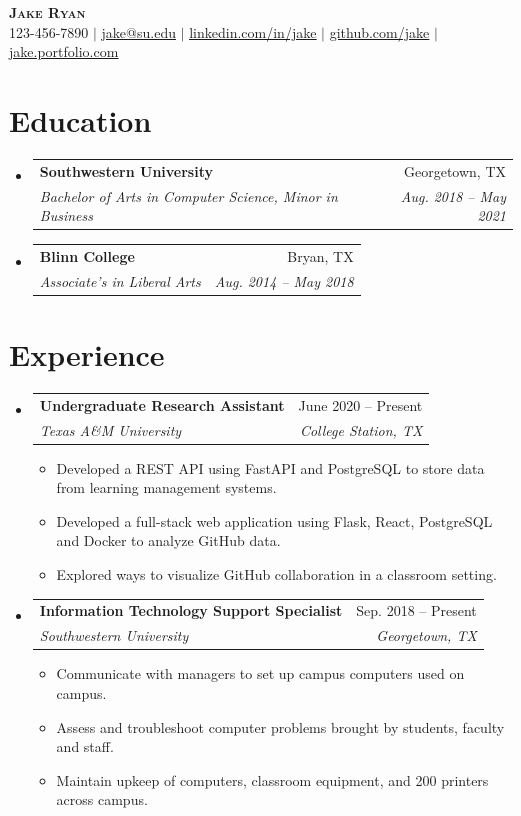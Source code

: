 \documentclass[letterpaper,11pt]{article}
\makeatletter
\newcommand{\resumeItem}[1]{
  \item\small{
    {#1 \vspace{-2pt}}
  }
}
\newcommand{\resumeSubheading}[4]{
  \vspace{-2pt}\item
    \begin{tabular*}{0.97\textwidth}[t]{l@{\extracolsep{\fill}}r}
      \textbf{#1} & #2 \\
      \textit{\small#3} & \textit{\small #4} \\
    \end{tabular*}\vspace{-7pt}
}
\newcommand{\resumeSubHeadingListStart}{\begin{itemize}[leftmargin=0.15in, label={}]}
\newcommand{\resumeSubHeadingListEnd}{\end{itemize}}
\newcommand{\resumeItemListStart}{\begin{itemize}}
\newcommand{\resumeItemListEnd}{\end{itemize}\vspace{-5pt}}
\makeatother
\begin{document}
\begin{center}
    \textbf{\Huge \scshape Jake Ryan} \\ \vspace{2pt}
    \small 123-456-7890 $|$ \href{mailto:jake@su.edu}{\underline{jake@su.edu}} $|$ 
    \href{https://linkedin.com/in/jake}{\underline{linkedin.com/in/jake}} $|$
    \href{https://github.com/jake}{\underline{github.com/jake}} $|$
    \href{https://jake.portfolio.com}{\underline{jake.portfolio.com}}
\end{center}

\section{Education}
  \resumeSubHeadingListStart
    \resumeSubheading
      {Southwestern University}{Georgetown, TX}
      {Bachelor of Arts in Computer Science, Minor in Business}{Aug. 2018 -- May 2021}
    \resumeSubheading
      {Blinn College}{Bryan, TX}
      {Associate's in Liberal Arts}{Aug. 2014 -- May 2018}
  \resumeSubHeadingListEnd

\section{Experience}
  \resumeSubHeadingListStart

    \resumeSubheading
      {Undergraduate Research Assistant}{June 2020 -- Present}
      {Texas A\&M University}{College Station, TX}
      \resumeItemListStart
        \resumeItem{Developed a REST API using FastAPI and PostgreSQL to store data from learning management systems.}
        \resumeItem{Developed a full-stack web application using Flask, React, PostgreSQL and Docker to analyze GitHub data.}
        \resumeItem{Explored ways to visualize GitHub collaboration in a classroom setting.}
      \resumeItemListEnd
      
    \resumeSubheading
      {Information Technology Support Specialist}{Sep. 2018 -- Present}
      {Southwestern University}{Georgetown, TX}
      \resumeItemListStart
        \resumeItem{Communicate with managers to set up campus computers used on campus.}
        \resumeItem{Assess and troubleshoot computer problems brought by students, faculty and staff.}
        \resumeItem{Maintain upkeep of computers, classroom equipment, and 200 printers across campus.}
    \resumeItemListEnd

  \resumeSubHeadingListEnd
\end{document}

